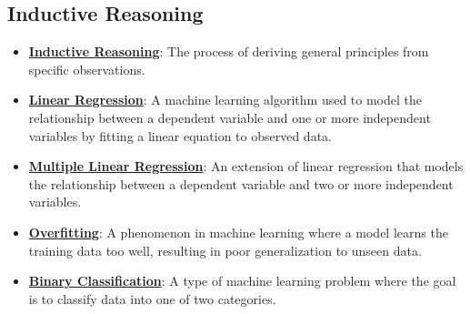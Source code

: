 \documentclass{article}%
\begin{document}
%
\subsection{Inductive Reasoning}%
\label{subsec:InductiveReasoning}%
\begin{itemize}[leftmargin=*]%
\item \href{\url{https://purdue.brightspace.com/d2l/common/assets/pdfjs-d2l-dist/1.0.14-legacy/web/viewer.html?file=\%252Fcontent\%252Fenforced\%252F1095467-wl.202510.CS.24300.001\%252F05L2-ML\%20Basics.pdf\%253Fou\%253D1095467\&lang=en-us\&container=d2l-fileviewer-rendered-pdf\&fullscreen=d2l-fileviewer-rendered-pdf-dialog\&height=667}#page=3}{\textbf{Inductive Reasoning}}: The process of deriving general principles from specific observations.%
\item \href{\url{https://purdue.brightspace.com/d2l/common/assets/pdfjs-d2l-dist/1.0.14-legacy/web/viewer.html?file=\%252Fcontent\%252Fenforced\%252F1095467-wl.202510.CS.24300.001\%252F05L2-ML\%20Basics.pdf\%253Fou\%253D1095467\&lang=en-us\&container=d2l-fileviewer-rendered-pdf\&fullscreen=d2l-fileviewer-rendered-pdf-dialog\&height=667}#page=6}{\textbf{Linear Regression}}: A machine learning algorithm used to model the relationship between a dependent variable and one or more independent variables by fitting a linear equation to observed data.%
\item \href{\url{https://purdue.brightspace.com/d2l/common/assets/pdfjs-d2l-dist/1.0.14-legacy/web/viewer.html?file=\%252Fcontent\%252Fenforced\%252F1095467-wl.202510.CS.24300.001\%252F05L2-ML\%20Basics.pdf\%253Fou\%253D1095467\&lang=en-us\&container=d2l-fileviewer-rendered-pdf\&fullscreen=d2l-fileviewer-rendered-pdf-dialog\&height=667}#page=11}{\textbf{Multiple Linear Regression}}: An extension of linear regression that models the relationship between a dependent variable and two or more independent variables.%
\item \href{\url{https://purdue.brightspace.com/d2l/common/assets/pdfjs-d2l-dist/1.0.14-legacy/web/viewer.html?file=\%252Fcontent\%252Fenforced\%252F1095467-wl.202510.CS.24300.001\%252F05L2-ML\%20Basics.pdf\%253Fou\%253D1095467\&lang=en-us\&container=d2l-fileviewer-rendered-pdf\&fullscreen=d2l-fileviewer-rendered-pdf-dialog\&height=667}#page=14}{\textbf{Overfitting}}: A phenomenon in machine learning where a model learns the training data too well, resulting in poor generalization to unseen data.%
\item \href{\url{https://purdue.brightspace.com/d2l/common/assets/pdfjs-d2l-dist/1.0.14-legacy/web/viewer.html?file=\%252Fcontent\%252Fenforced\%252F1095467-wl.202510.CS.24300.001\%252F05L2-ML\%20Basics.pdf\%253Fou\%253D1095467\&lang=en-us\&container=d2l-fileviewer-rendered-pdf\&fullscreen=d2l-fileviewer-rendered-pdf-dialog\&height=667}#page=20}{\textbf{Binary Classification}}: A type of machine learning problem where the goal is to classify data into one of two categories.%

\end{itemize}
\end{document}
